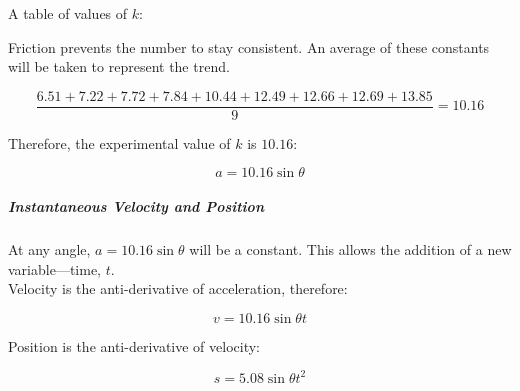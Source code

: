 A table of values of $k$:

\begin{table}[H]
  \centering
  \caption{Experimental Constant}
  \label{table:experimental_k_table}
\end{table}

Friction prevents the number to stay consistent. An average of these constants will be taken to represent the trend.

\begin{equation}
  \frac{6.51 + 7.22 + 7.72 + 7.84 + 10.44 + 12.49 + 12.66 + 12.69 + 13.85}{9} = 10.16
\end{equation}

Therefore, the experimental value of $k$ is $10.16$:

\begin{equation}
  a = 10.16\sin{\theta}
\end{equation}

\subparagraph{Instantaneous Velocity and Position}
\label{subp:Instantaneous Velocity and Position}
At any angle, $a = 10.16\sin{\theta}$ will be a constant. This allows the addition of a new variable---time, $t$.\\

Velocity is the anti-derivative of acceleration, therefore:

\begin{equation}
  v = 10.16\sin{\theta}t
\end{equation}

Position is the anti-derivative of velocity:

\begin{equation}
  s = 5.08\sin{\theta}t^2
\end{equation}

%
%
%
%
